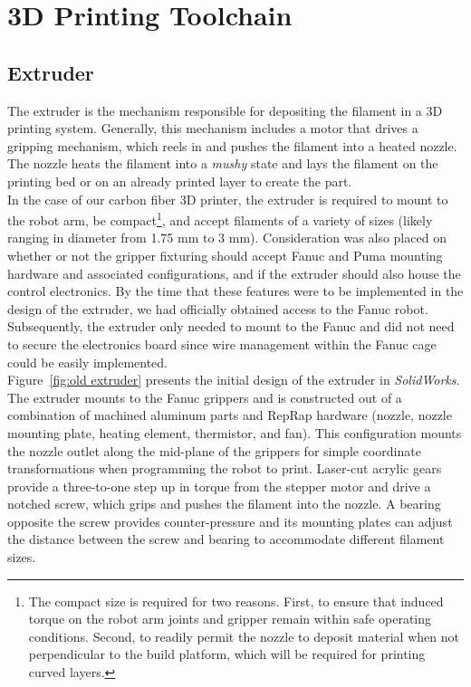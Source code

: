 \section{3D Printing Toolchain}

\subsection{Extruder}

\indent

The extruder is the mechanism responsible for depositing the filament in a 3D printing system. Generally, this mechanism includes a motor that drives a gripping mechanism, which reels in and pushes the filament into a heated nozzle. The nozzle heats the filament into a \emph{mushy} state and lays the filament on the printing bed or on an already printed layer to create the part.\\

In the case of our carbon fiber 3D printer, the extruder is required to mount to the robot arm, be compact\footnote{The compact size is required for two reasons. First, to ensure that induced torque on the robot arm joints and gripper remain within safe operating conditions. Second, to readily permit the nozzle to deposit material when not perpendicular to the build platform, which will be required for printing curved layers.}, and accept filaments of a variety of sizes (likely ranging in diameter from 1.75 mm to 3 mm). Consideration was also placed on whether or not the gripper fixturing should accept Fanuc and Puma mounting hardware and associated configurations, and if the extruder should also house the control electronics. By the time that these features were to be implemented in the design of the extruder, we had officially obtained access to the Fanuc robot. Subsequently, the extruder only needed to mount to the Fanuc and did not need to secure the electronics board since wire management within the Fanuc cage could be easily implemented.\\

Figure~\ref{fig:old extruder} presents the initial design of the extruder in \emph{SolidWorks}. The extruder mounts to the Fanuc grippers and is constructed out of a combination of machined aluminum parts and RepRap hardware (nozzle, nozzle mounting plate, heating element, thermistor, and fan). This configuration mounts the nozzle outlet along the mid-plane of the grippers for simple coordinate transformations when programming the robot to print. Laser-cut acrylic gears provide a three-to-one step up in torque from the stepper motor and drive a notched screw, which grips and pushes the filament into the nozzle. A bearing opposite the screw provides counter-pressure and its mounting plates can adjust the distance between the screw and bearing to accommodate different filament sizes.\\

